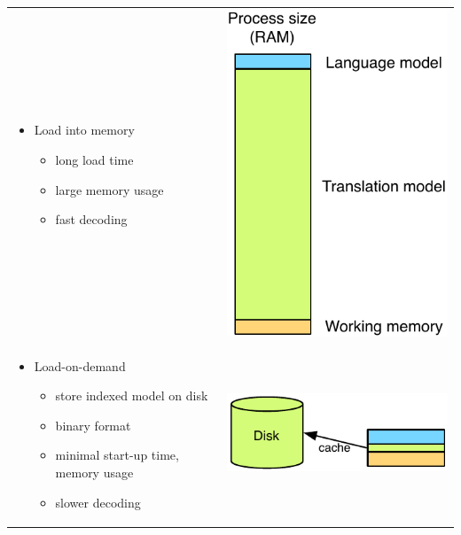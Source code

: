 \documentclass[landscape]{uedslides2C}
\begin{document}

\vspace{10mm}
\begin{tabular}{p{13cm}c}
\vspace{-7cm}
\begin{itemize}
\item Load into memory
	\begin{itemize}
	\item long load time
	\item large memory usage
	\item fast decoding
	\end{itemize}
\end{itemize}
& \includegraphics[scale=0.8]{less-memory-europarl.pdf} \\[1cm]
\vspace{-4.5cm}
\begin{itemize}
\item Load-on-demand
	\begin{itemize}
  	\item store indexed model on disk
	\item binary format
	\item minimal start-up time, memory usage
	\item slower decoding
	\end{itemize}
\end{itemize}
&  \includegraphics[scale=0.8]{less-memory-europarl-on-disk.pdf}
\end{tabular}
\end{document}
